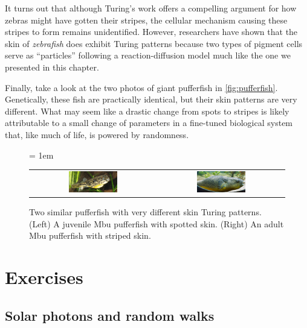 It turns out that although Turing's work offers a compelling argument for how zebras might have gotten their stripes, the cellular mechanism causing these stripes to form remains unidentified. However, researchers have shown that the skin of \textit{zebrafish} does exhibit Turing patterns because two types of pigment cells serve as ``particles'' following a reaction-diffusion model much like the one we presented in this chapter.

Finally, take a look at the two photos of giant pufferfish in \autoref{fig:pufferfish}. Genetically, these fish are practically identical, but their skin patterns are very different. What may seem like a drastic change from spots to stripes is likely attributable to a small change of parameters in a fine-tuned biological system that, like much of life, is powered by randomness.\\

\begin{figure}[h]
\centering
\mySfFamily
\tabcolsep = 1em
\begin{tabular}{c c}
\includegraphics[width = 0.4\textwidth]{../images/Juvenile_Mbu_pufferfish} & \includegraphics[width = 0.4\textwidth]{../images/Giant_Puffer_fish_skin_pattern}
\end{tabular}
\caption{Two similar pufferfish with very different skin Turing patterns. (Left) A juvenile Mbu pufferfish with spotted skin. (Right) An adult Mbu pufferfish with striped skin.}
\label{fig:pufferfish}
\end{figure}

\FloatBarrier
{}
\newpage
\section{Exercises}

\subsection{Solar photons and random walks}

